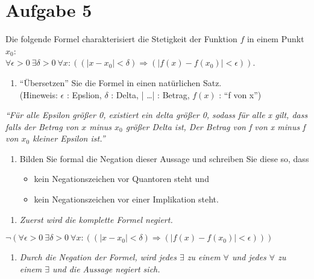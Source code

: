 \section*{Aufgabe 5}

Die folgende Formel charakterisiert die Stetigkeit der Funktion $f$ in einem Punkt $x_0$:\\
$\forall \epsilon > 0 \ \exists \delta > 0 \ \forall  x : ((| x - x_0 | < \delta) \Rightarrow (| f(x) - f(x_0)| < \epsilon))$.

\begin{enumerate}[label={a)}, leftmargin=*]
\item ``Übersetzen'' Sie die Formel in einen natürlichen Satz.\\
(Hineweis: $\epsilon$ : Epslion, $\delta$ : Delta, | \dots | : Betrag, $f(x)$ : ``f von x'')
\end{enumerate}

\textit{``Für alle Epsilon größer 0, existiert ein delta größer 0, sodass für alle x gilt, dass falls der Betrag von $x$ minus $x_0$ größer Delta ist, Der Betrag von f von x minus f von $x_0$ kleiner Epsilon ist.''}

\begin{enumerate}[label={b)}, leftmargin=*]
\item Bilden Sie formal die Negation dieser Aussage und schreiben Sie diese so, dass
\begin{itemize}
\item kein Negationszeichen vor Quantoren steht und
\item kein Negationszeichen vor einer Implikation steht.
\end{itemize}
\end{enumerate}

\begin{enumerate}[leftmargin=*]
\item \textit{Zuerst wird die komplette Formel negiert.}
\end{enumerate}

\begin{center}
$\lnot (\forall \epsilon > 0 \ \exists \delta > 0 \ \forall  x : ((| x - x_0 | < \delta) \Rightarrow (| f(x) - f(x_0)| < \epsilon)))$
\end{center}


\begin{enumerate}[label={2.}, leftmargin=*]
\item \textit{Durch die Negation der Formel, wird jedes $\exists$ zu einem $\forall$ und jedes $\forall$ zu einem $\exists$ und die Aussage negiert sich.}
\end{enumerate}

